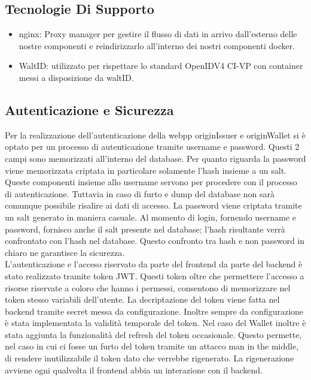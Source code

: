 \subsection{Tecnologie Di Supporto}
\begin{itemize}
    \item nginx: Proxy manager per gestire il flusso di dati in arrivo dall'esterno delle nostre componenti e reindirizzarlo all'interno dei nostri componenti docker.
    \item WaltID: utilizzato per rispettare lo standard OpenIDV4 CI-VP con container messi a disposizione da waltID.
\end{itemize}

\subsection{Autenticazione e Sicurezza}
Per la realizzazione dell'autenticazione della webpp originIssuer e originWallet si è optato per un processo di autenticazione tramite username e password. Questi 2 campi sono memorizzati all'interno del database. Per quanto riguarda la password viene memorizzata criptata in particolare solamente l'hash insieme a un salt. Queste componenti insieme allo username servono per procedere con il processo di autenticazione. Tuttavia in caso di furto e dump del database non sarà comunque possibile risalire ai dati di accesso. 
La password viene criptata tramite un salt generato in maniera casuale. Al momento di login, fornendo username e password, fornisco anche il salt presente nel database; l'hash risultante verrà confrontato con l'hash nel database. Questo confronto tra hash e non password in chiaro ne garantisce la sicurezza.\\
L'autenticazione e l'acceso riservato da parte del frontend da parte del backend è stato realizzato tramite token JWT. Questi token oltre che permettere l'accesso a risorse riservate a coloro che hanno i permessi, consentono di memorizzare nel token stesso variabili dell'utente. La decriptazione del token viene fatta nel backend tramite secret messa da configurazione. Inoltre sempre da configurazione è stata implementata  la validità temporale del token. Nel caso del Wallet inoltre è stata aggiunta la funzionalità del refresh del token occasionale. Questo permette, nel caso in cui ci fosse un furto del token tramite un attacco man in the middle, di rendere inutilizzabile il token dato che verrebbe rigenerato.  La rigenerazione avviene ogni qualvolta il frontend abbia un interazione con il backend.
